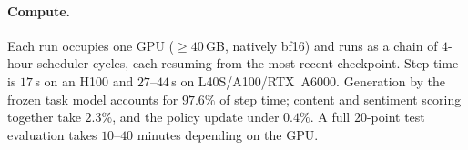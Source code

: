 \paragraph{Compute.}
Each run occupies one GPU ($\ge\!40$\,GB, natively bf16) and runs as a chain of
$4$-hour scheduler cycles, each resuming from the most recent checkpoint. Step
time is $17$\,s on an H100 and $27$--$44$\,s on L40S/A100/RTX~A6000.
Generation by the frozen task model accounts for $97.6\%$ of step time; content
and sentiment scoring together take $2.3\%$, and the policy update under
$0.4\%$. A full $20$-point test evaluation takes $10$--$40$ minutes depending on
the GPU.
